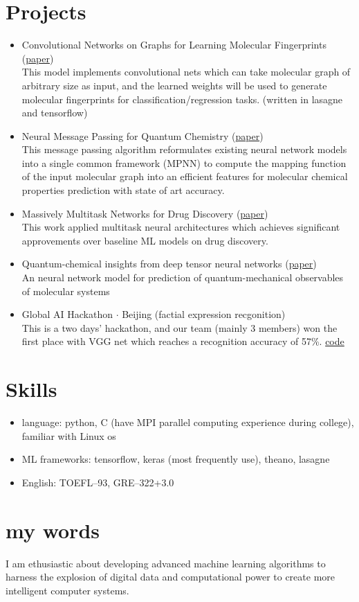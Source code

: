 \documentclass[letterpaper,11pt]{article}
\begin{document}
 

\section{Projects}
\begin{itemize}


\item Convolutional Networks on Graphs for Learning Molecular Fingerprints (\href{https://arxiv.org/pdf/1509.09292.pdf}{paper}) \\
    This model implements convolutional nets which can take molecular graph of 
    arbitrary size as input, and the learned weights will be used to generate 
        molecular fingerprints for classification/regression tasks.  (written in lasagne and tensorflow)
\item Neural Message Passing for Quantum Chemistry (\href{https://arxiv.org/abs/1704.01212}{paper}) \\
    This message passing algorithm reformulates existing neural network models into a single common framework (MPNN) 
    to compute the mapping function of the input molecular graph into an efficient features for molecular chemical properties
    prediction with state of art accuracy.
\item Massively Multitask Networks for Drug Discovery (\href{https://arxiv.org/abs/1502.02072}{paper}) \\
    This work applied multitask neural architectures which achieves significant approvements over baseline ML models on drug discovery.

\item Quantum-chemical insights from deep tensor neural networks (\href{https://www.nature.com/articles/ncomms13890}{paper}) \\
    An neural network model for prediction of quantum-mechanical observables of molecular systems
\item Global AI Hackathon $\cdot$ Beijing (factial expression recgonition) \\
    This is a two days' hackathon, and our team (mainly 3 members) won the first place with VGG net which reaches a
        recognition accuracy of 57\%. \href{https://github.com/huizhuzhao/Hackthon/tree/master/xlyte}{code}

\end{itemize}


\section{Skills}
\begin{itemize}
    \item language: python, C (have MPI parallel computing experience during college), familiar with Linux os
    \item ML frameworks: tensorflow, keras (most frequently use), theano, lasagne
    \item English: TOEFL--93, GRE--322+3.0
\end{itemize}

\section{my words}
I am ethusiastic about developing advanced machine learning algorithms to harness the explosion of 
digital data and computational power to create more intelligent computer systems.

\end{document}
